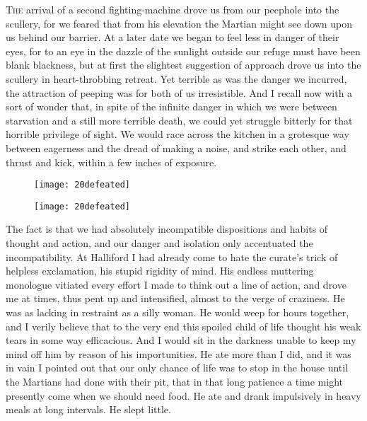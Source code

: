 

\lettrine[lines=4,findent=2pt]{T}{he} arrival of a second fighting-machine drove us from our peephole into the scullery, for we feared that from his elevation the Martian might see down upon us behind our barrier. At a later date we began to feel less in danger of their eyes, for to an eye in the dazzle of the sunlight outside our refuge must have been blank blackness, but at first the slightest suggestion of approach drove us into the scullery in heart-throbbing retreat. Yet terrible as was the danger we incurred, the attraction of peeping was for both of us irresistible. And I recall now with a sort of wonder that, in spite of the infinite danger in which we were between starvation and a still more terrible death, we could yet struggle bitterly for that horrible privilege of sight. We would race across the kitchen in a grotesque way between eagerness and the dread of making a noise, and strike each other, and thrust and kick, within a few inches of exposure.

\begin{letter}
	\begin{figure}[tb]
	\centering
	\texttt{[image: 20defeated]}
	\end{figure}
\end{letter}

\begin{a4}
	\begin{figure}[tb]
	\centering
	\texttt{[image: 20defeated]}
	\end{figure}
\end{a4}

The fact is that we had absolutely incompatible dispositions and habits of thought and action, and our danger and isolation only accentuated the incompatibility. At Halliford I had already come to hate the curate's trick of helpless exclamation, his stupid rigidity of mind. His endless muttering monologue vitiated every effort I made to think out a line of action, and drove me at times, thus pent up and intensified, almost to the verge of craziness. He was as lacking in restraint as a silly woman. He would weep for hours together, and I verily believe that to the very end this spoiled child of life thought his weak tears in some way efficacious. And I would sit in the darkness unable to keep my mind off him by reason of his importunities. He ate more than I did, and it was in vain I pointed out that our only chance of life was to stop in the house until the Martians had done with their pit, that in that long patience a time might presently come when we should need food. He ate and drank impulsively in heavy meals at long intervals. He slept little.

